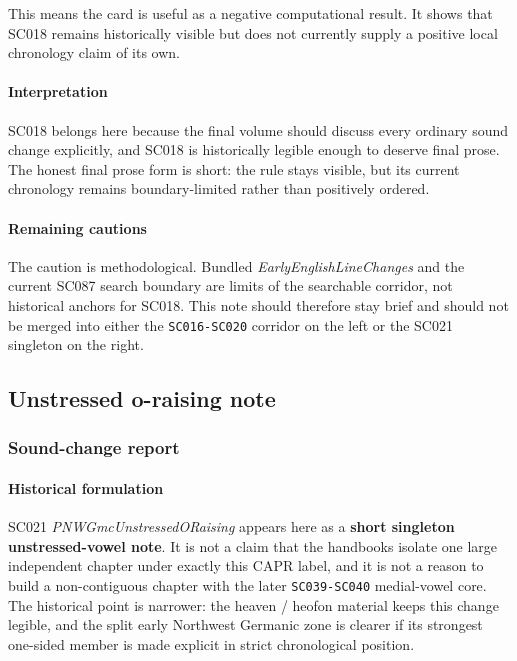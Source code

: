 \documentclass[
  british,
  a4paper,
]{article}
\begin{document}
This means the card is useful as a negative computational result. It
shows that SC018 remains historically visible but does not currently
supply a positive local chronology claim of its own.

\paragraph{Interpretation}\label{interpretation-13}

SC018 belongs here because the final volume should discuss every
ordinary sound change explicitly, and SC018 is historically legible
enough to deserve final prose. The honest final prose form is short: the
rule stays visible, but its current chronology remains boundary-limited
rather than positively ordered.

\paragraph{Remaining cautions}\label{remaining-cautions-13}

The caution is methodological. Bundled \emph{EarlyEnglishLineChanges}
and the current SC087 search boundary are limits of the searchable
corridor, not historical anchors for SC018. This note should therefore
stay brief and should not be merged into either the \texttt{SC016-SC020}
corridor on the left or the SC021 singleton on the right.

\subsection{Unstressed o-raising note}\label{unstressed-o-raising-note}

\subsubsection{Sound-change report}\label{sound-change-report-14}

\paragraph{Historical formulation}\label{historical-formulation-14}

SC021 \emph{PNWGmcUnstressedORaising} appears here as a \textbf{short
singleton unstressed-vowel note}. It is not a claim that the handbooks
isolate one large independent chapter under exactly this CAPR label, and
it is not a reason to build a non-contiguous chapter with the later
\texttt{SC039-SC040} medial-vowel core. The historical point is
narrower: the heaven / heofon material keeps this change legible, and
the split early Northwest Germanic zone is clearer if its strongest
one-sided member is made explicit in strict chronological position.
\end{document}
